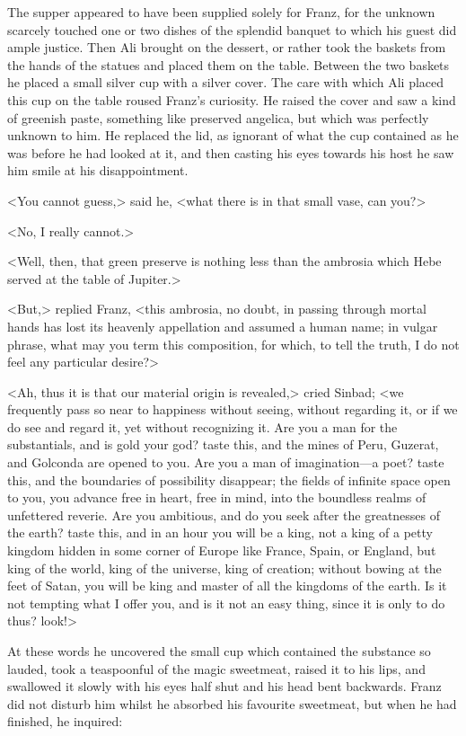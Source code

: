  The supper appeared to have been supplied solely for Franz, for the unknown scarcely touched one or two dishes of the splendid banquet to which his guest did ample justice. Then Ali brought on the dessert, or rather took the baskets from the hands of the statues and placed them on the table. Between the two baskets he placed a small silver cup with a silver cover. The care with which Ali placed this cup on the table roused Franz's curiosity. He raised the cover and saw a kind of greenish paste, something like preserved angelica, but which was perfectly unknown to him. He replaced the lid, as ignorant of what the cup contained as he was before he had looked at it, and then casting his eyes towards his host he saw him smile at his disappointment. 

 <You cannot guess,> said he, <what there is in that small vase, can you?> 

 <No, I really cannot.> 

 <Well, then, that green preserve is nothing less than the ambrosia which Hebe served at the table of Jupiter.> 

 <But,> replied Franz, <this ambrosia, no doubt, in passing through mortal hands has lost its heavenly appellation and assumed a human name; in vulgar phrase, what may you term this composition, for which, to tell the truth, I do not feel any particular desire?> 

 <Ah, thus it is that our material origin is revealed,> cried Sinbad; <we frequently pass so near to happiness without seeing, without regarding it, or if we do see and regard it, yet without recognizing it. Are you a man for the substantials, and is gold your god? taste this, and the mines of Peru, Guzerat, and Golconda are opened to you. Are you a man of imagination—a poet? taste this, and the boundaries of possibility disappear; the fields of infinite space open to you, you advance free in heart, free in mind, into the boundless realms of unfettered reverie. Are you ambitious, and do you seek after the greatnesses of the earth? taste this, and in an hour you will be a king, not a king of a petty kingdom hidden in some corner of Europe like France, Spain, or England, but king of the world, king of the universe, king of creation; without bowing at the feet of Satan, you will be king and master of all the kingdoms of the earth. Is it not tempting what I offer you, and is it not an easy thing, since it is only to do thus? look!> 

 At these words he uncovered the small cup which contained the substance so lauded, took a teaspoonful of the magic sweetmeat, raised it to his lips, and swallowed it slowly with his eyes half shut and his head bent backwards. Franz did not disturb him whilst he absorbed his favourite sweetmeat, but when he had finished, he inquired: 

